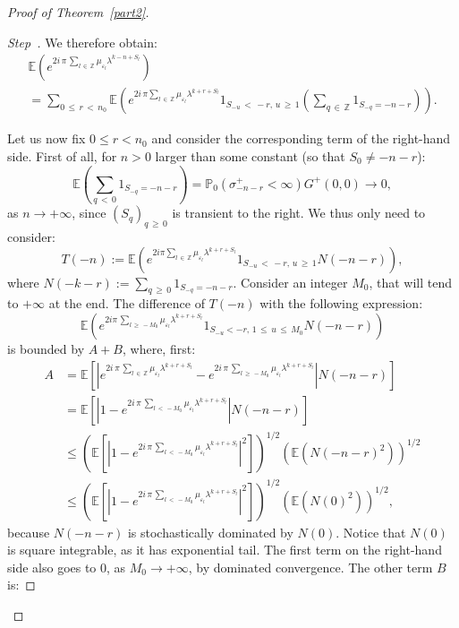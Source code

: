 \documentclass[10pt]{amsart}
\theoremstyle{definition}\newtheorem{defi}[theo]{Definition}\newtheorem{rema}[theo]{Remark}\newtheorem{exam}[theo]{Example}\newtheorem{exem}[theo]{Example}\newtheorem{nota}[theo]{Notation}
\newcommand{\Pbb}{\mathbb P}
\newcommand{\Ebb}{\mathbb E}
\newcommand{\Zbb}{\mathbb Z}
\newcounter{stepcount}
\newenvironment{step}{\refstepcounter{stepcount}\begin{proof}[Step~\thestepcount]}{\let\qed\relax\end{proof}}
\begin{document}
\begin{proof}[{Proof of Theorem~\ref{part2}}]
\begin{step}
We therefore obtain:
\begin{multline*}
\Ebb\left({e^{2i\,\pi\,\sum_{l\,\in\,\Zbb}\mu_{\varepsilon_l}\lambda^{k-n+S_l}}}\right)\\
=\sum_{0\,\leq\,r\,<\,n_0}\Ebb\left({e^{2i\,\pi \sum_{l\,\in\,\Zbb}\mu_{\varepsilon_{l}}\lambda^{k+r+S_{l}}}1_{S_{-u}\,<\,-r,\,u\,\geq\,1}\left({\sum_{q\,\in\,\Zbb}1_{S_{-q}=-n-r}}\right)}\right).
\end{multline*}



Let us now fix $0\leq r< n_0$ and consider the corresponding term of the right-hand side. First of all, for $n>0$ larger than some constant (so that $S_0\not=-n-r$):
\begin{equation}
\Ebb\left({\sum_{q\,<\,0}1_{S_{-q}=-n-r}}\right)=\Pbb_0\left(\sigma^+_{-n-r}<\infty\right)G^+(0,0)\rightarrow0,
\end{equation}
as $n\rightarrow+\infty$, since $(S_{q})_{q\,\geq\,0}$ is transient to the right. We thus only need to consider:
\[
T(-n):=\Ebb\left({e^{2i\pi \sum_{l\,\in\,\Zbb}\mu_{\varepsilon_{l}}\lambda^{k+r+S_{l}}}1_{S_{-u}\,<\,-r,\,u\,\geq\,1}N(-n-r)}\right),
\]
where $N(-k-r):=\sum_{q\,\geq\,0}1_{S_{-q}=-n-r}$. Consider an integer $M_0$, that will tend to $+\infty$ at the end. The difference of $T(-n)$ with the following expression:
\[
\Ebb\left({e^{2i\pi\,\sum_{l\,\geq\,-M_0}\mu_{\varepsilon_{l}}\lambda^{k+r+S_{l}}}1_{S_{-u}<-r,\,1\,\leq\,u\,\leq\,M_0}N(-n-r)}\right)
\]
is bounded by $A+B$, where, first:
\begin{align*}
A&=\Ebb
\left[
{\left|{e^{2i\,\pi\,\sum_{l\,\in\,\Zbb}\mu_{\varepsilon_l}\lambda^{k+r+S_l}}-e^{2i\,\pi \,\sum_{l\,\geq\,-M_0}\mu_{\varepsilon_l}\lambda^{k+r+S_l}}}\right|N(-n-r)}
\right]
\\
&=\Ebb
\left[
{\left|{1-e^{2i\,\pi\,\sum_{l\,<\,-M_0}\mu_{\varepsilon_l}\lambda^{k+r+S_l}}}\right|N(-n-r)}
\right]
\\
&\leq \left({\Ebb
\left[
{\left|{1-e^{2i\,\pi\,\sum_{l\,<\,-M_0}\mu_{\varepsilon_l}\lambda^{k+r+S_l}}}\right|^2}
\right]
}\right)^{1/2}\left({\Ebb\left(N(-n-r)^2\right)}\right)^{1/2}\\
&\leq \left({\Ebb
\left[
{\left|{1-e^{2i\,\pi\,\sum_{l\,<\,-M_0}\mu_{\varepsilon_l}\lambda^{k+r+S_l}}}\right|^2}
\right]
}\right)^{1/2}\left({\Ebb\left(N(0)^2\right)}\right)^{1/2},
\end{align*}
because $N(-n-r)$ is stochastically dominated by $N(0)$. Notice that $N(0)$ is square integrable, as it has exponential tail. The first term on the right-hand side also goes to 0, as $M_0\rightarrow+\infty$, by dominated convergence. The other term $B$ is:

\end{step}
\end{proof}
\end{document}

